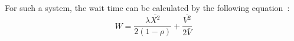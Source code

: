 For such a system, the wait time can be calculated by the following equation~\cite{21}:
\begin{equation}
\label{eq:waiting_2}
W = \frac{\lambda\bar{X^2}}{2 (1-\rho)} + \frac{\bar{V^2}}{2\bar{V}}
\end{equation}
